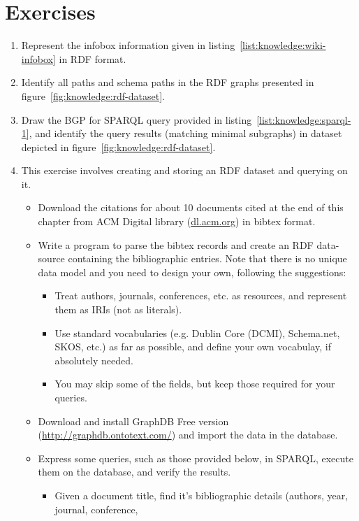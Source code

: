 \section*{Exercises}

\begin{enumerate}
	\item Represent the infobox information given in listing~\ref{list:knowledge:wiki-infobox} in RDF format.
	\item Identify all paths and schema paths in the RDF graphs presented in figure~\ref{fig:knowledge:rdf-dataset}.
	\item Draw the BGP for SPARQL query provided in listing~\ref{list:knowledge:sparql-1}, and identify the query results (matching 
		minimal subgraphs) in dataset depicted in figure~\ref{fig:knowledge:rdf-dataset}.
	\item This exercise involves creating and storing an RDF dataset and querying on it. 
		\begin{itemize}
			\item Download the citations for about 10 documents cited at the end of this chapter from ACM Digital library 
				(\url{dl.acm.org}) in bibtex format. 
			\item Write a program to parse the bibtex records and create 
				an RDF data-source containing the bibliographic entries. Note that there is no unique data model and
				you need to design your own, following the suggestions:
					\begin{itemize} 
						\item Treat authors, journals, conferences, etc. as resources, and represent them 
							as IRIs (not as literals).  
						\item Use standard vocabularies (e.g. Dublin Core (DCMI), Schema.net, SKOS, etc.)
							as far as possible, and define your own vocabulay, if absolutely needed. 
						\item You may skip some of the fields, but keep those required for your queries.
					\end{itemize}
			\item Download and install GraphDB Free version (\url{http://graphdb.ontotext.com/}) and import the data
				in the database.
			\item Express some queries, such as those provided below, in SPARQL, execute them on the database, and 
				verify the results.
				\begin{itemize}
					\item Given a document title, find it's bibliographic details (authors, year, journal, conference, 

\end{itemize}
\end{itemize}
\end{enumerate}
